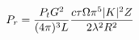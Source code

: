 \documentclass[preview]{standalone}
\begin{document}
\begin{align*}
\special{dvisvgm:raw <g id='unique000'>}P_r = \frac{P_t G^2}{(4 \pi)^3 L} \frac{c \tau \Omega \pi^5 |K|^2 Z}{2 \lambda^2 R^2}\special{dvisvgm:raw </g>}
\end{align*}
\end{document}
